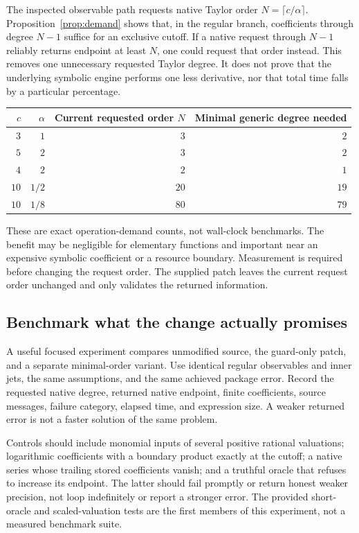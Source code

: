 \documentclass[11pt,letterpaper]{article}
\theoremstyle{definition}\newtheorem{definition}[proposition]{Definition}
\begin{document}
The inspected observable path requests native Taylor order
$N=\lceil c/\alpha\rceil$. Proposition~\ref{prop:demand} shows that, in the regular
branch, coefficients through degree $N-1$ suffice for an exclusive cutoff.
If a native request through $N-1$ reliably returns endpoint at least $N$, one
could request that order instead. This removes one unnecessary requested
Taylor degree. It does not prove that the underlying symbolic engine performs
one less derivative, nor that total time falls by a particular percentage.

\begin{center}
\begin{tabular}{rrrr}
\toprule
$c$ & $\alpha$ & Current requested order $N$ & Minimal generic degree needed\\
\midrule
$3$ & $1$ & $3$ & $2$\\
$5$ & $2$ & $3$ & $2$\\
$4$ & $2$ & $2$ & $1$\\
$10$ & $1/2$ & $20$ & $19$\\
$10$ & $1/8$ & $80$ & $79$\\
\bottomrule
\end{tabular}
\end{center}
These are exact operation-demand counts, not wall-clock benchmarks. The benefit
may be negligible for elementary functions and important near an expensive
symbolic coefficient or a resource boundary. Measurement is required before
changing the request order. The supplied patch leaves the current request
order unchanged and only validates the returned information.

\subsection{Benchmark what the change actually promises}
A useful focused experiment compares unmodified source, the guard-only patch,
and a separate minimal-order variant. Use identical regular observables and
inner jets, the same assumptions, and the same achieved package error. Record
the requested native degree, returned native endpoint, finite coefficients,
source messages, failure category, elapsed time, and expression size.
A weaker returned error is not a faster solution of the same problem.

Controls should include monomial inputs of several positive rational
valuations; logarithmic coefficients with a boundary product exactly at the
cutoff; a native series whose trailing stored coefficients vanish; and a
truthful oracle that refuses to increase its endpoint. The latter should fail
promptly or return honest weaker precision, not loop indefinitely or report
a stronger error. The provided short-oracle and scaled-valuation tests are the
first members of this experiment, not a measured benchmark suite.
\end{document}
